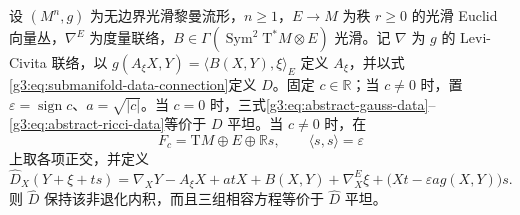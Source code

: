 \begin{proposition}\label{g3:prop:compatibility-flat-connection}
	设 \((M^n,g)\) 为无边界光滑黎曼流形，\(n\ge1\)，\(E\to M\) 为秩 \(r\ge0\) 的光滑 Euclid 向量丛，\(\nabla^E\) 为度量联络，\(B\in\Gamma(\operatorname{Sym}^2\mathrm T^*M\otimes E)\) 光滑。记 \(\nabla\) 为 \(g\) 的 Levi-Civita 联络，以 \(g(A_\xi X,Y)=\langle B(X,Y),\xi\rangle_E\) 定义 \(A_\xi\)，并以式\eqref{g3:eq:submanifold-data-connection}定义 \(D\)。固定 \(c\in\mathbb R\)；当 \(c\ne0\) 时，置 \(\varepsilon=\operatorname{sign}c\)、\(a=\sqrt{|c|}\)。当 \(c=0\) 时，三式\eqref{g3:eq:abstract-gauss-data}--\eqref{g3:eq:abstract-ricci-data}等价于 \(D\) 平坦。当 \(c\ne0\) 时，在
	\[
		F_c=\mathrm TM\oplus E\oplus\mathbb R s,
		\qquad\langle s,s\rangle=\varepsilon
	\]
	上取各项正交，并定义
	\begin{equation}\label{g3:eq:augmented-submanifold-connection}
		\widehat D_X(Y+\xi+t s)
		=\nabla_XY-A_\xi X+a tX
		+B(X,Y)+\nabla^E_X\xi
		+\bigl(Xt-\varepsilon a g(X,Y)\bigr)s.
	\end{equation}
	则 \(\widehat D\) 保持该非退化内积，而且三组相容方程等价于 \(\widehat D\) 平坦。
\end{proposition}

